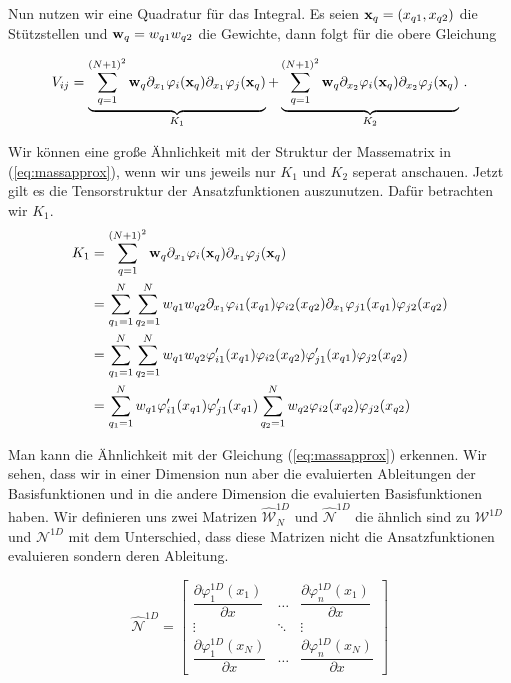 Nun nutzen wir eine Quadratur für das Integral. Es seien $\bold{x}_q=(x_{q1},x_{q2})$ die Stützstellen und $\bold{w}_q=w_{q1}w_{q2}$ die Gewichte, dann folgt für die obere Gleichung

\begin{equation}
\begin{aligned}
V_{ij}  = \underbrace{\sum\limits_{q=1}^{(N+1)^2} \bold{w}_q \partial_{x_1}  \varphi_i(\bold{x}_q)  \partial_{x_1} \varphi_j (\bold{x}_q)}_{K_1} + \underbrace{\sum\limits_{q=1}^{(N+1)^2} \bold{w}_q  \partial_{x_2} \varphi_i(\bold{x}_q)  \partial_{x_2} \varphi_j(\bold{x}_q)}_{K_2} \, .
\end{aligned}
\end{equation}

Wir können eine große Ähnlichkeit mit der Struktur der Massematrix in (\ref{eq:massapprox}), wenn wir uns jeweils nur $K_1$ und $K_2$ seperat anschauen. Jetzt gilt es die Tensorstruktur der Ansatzfunktionen auszunutzen. Dafür betrachten wir $K_1$.
\begin{equation}
\begin{aligned}
K_1 &=\sum\limits_{q=1}^{(N+1)^2} \bold{w}_q \partial_{x_1}  \varphi_i(\bold{x}_q)  \partial_{x_1} \varphi_j (\bold{x}_q) \\ &= \sum\limits_{q_1=1}^{N} \sum\limits_{q_2=1}^{N} w_{q1}w_{q2} \partial_{x_1}  \varphi_{i1}(x_{q1})\varphi_{i2}(x_{q2})  \partial_{x_1} \varphi_{j1} (x_{q1})\varphi_{j2} (x_{q2}) \\
&=  \sum\limits_{q_1=1}^{N} \sum\limits_{q_2=1}^{N} w_{q1}w_{q2} \varphi'_{i1}(x_{q1})\varphi_{i2}(x_{q2})  \varphi'_{j1} (x_{q1})\varphi_{j2} (x_{q2}) \\ 
&= \sum\limits_{q_1=1}^{N} w_{q1} \varphi'_{i1}(x_{q1}) \varphi'_{j1} (x_{q1}) \sum\limits_{q_2=1}^{N} w_{q2} \varphi_{i2}(x_{q2})  \varphi_{j2} (x_{q2}) 
\end{aligned}
\end{equation}

Man kann die Ähnlichkeit mit der Gleichung (\ref{eq:massapprox}) erkennen. Wir sehen, dass wir in einer Dimension nun aber die evaluierten Ableitungen der Basisfunktionen und in die andere Dimension die evaluierten Basisfunktionen haben.
Wir definieren uns zwei Matrizen $\widehat{\mathcal{W}}^{1D}_N$ und $\widehat{\mathcal{N}}^{1D}$ die ähnlich sind zu $\mathcal{W}^{1D}$ und $\mathcal{N}^{1D}$ mit dem Unterschied, dass diese Matrizen nicht die Ansatzfunktionen evaluieren sondern deren Ableitung.

\begin{equation}
\widehat{\mathcal{N}}^{1D} = 
\begin{bmatrix}
\dfrac{\partial \varphi^{1D}_1(x_1)}{\partial x} & \hdots & \dfrac{ \partial \varphi^{1D}_n(x_1)}{\partial x} \\
\vdots & \ddots & \vdots \\
\dfrac{\partial \varphi^{1D}_1(x_{N})}{\partial x} & \hdots & \dfrac{ \partial \varphi^{1D}_n(x_{N})}{\partial x}
\end{bmatrix}
\end{equation}

